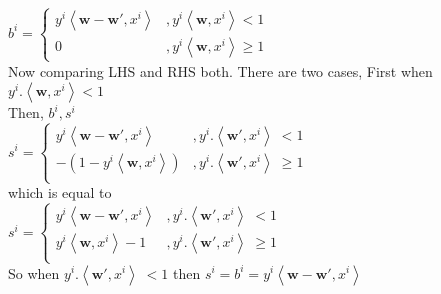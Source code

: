 \documentclass[a4paper,11pt]{article}
\begin{document}
\begin{mlsolution}
\begin{math}
b^{i} = \left\{\begin{matrix}
y^{i} \left \langle \textbf{w} - \textbf{w}{}', x^{i} \right \rangle & ,y^{i}\left \langle \textbf{w}, x^{i} \right \rangle < 1\\ 
0 & ,y^{i}\left \langle \textbf{w}, x^{i} \right \rangle \geq 1
\end{matrix}\right.
\end{math}\\

Now comparing LHS and RHS both. There are two cases, First when \begin{math}y^{i}.\left \langle \textbf{w}, x^{i} \right \rangle < 1 \end{math}\\

Then, \begin{math}b^{i}, s^{i}\end{math}\\

\begin{math}
s^{i} = \left\{\begin{matrix}
y^{i} \left \langle \textbf{w} -\textbf{w}{}', x^{i}\right \rangle & ,y^{i}.\left \langle \textbf{w}{}', x^{i} \right \rangle \; <  1\\ 
- \left ( 1 - y^{i}\left \langle \textbf{w}, x^{i}\right \rangle \right ) & ,y^{i}.\left \langle \textbf{w}{}', x^{i}\right \rangle \; \geq  1\\ 

\end{matrix}\right.
\end{math}\\

which is equal to \\

\begin{math}
s^{i} = \left\{\begin{matrix}
y^{i} \left \langle \textbf{w} -\textbf{w}{}', x^{i} \right \rangle & ,y^{i}.\left \langle \textbf{w}{}', x^{i}\right \rangle \; <  1\\ 
y^{i}\left \langle \textbf{w}, x^{i}\right \rangle -1 & ,y^{i}.\left \langle \textbf{w}{}', x^{i}\right \rangle \; \geq  1\\ 

\end{matrix}\right.
\end{math}\\

So when \begin{math}y^{i}.\left \langle \textbf{w}{}', x^{i} \right \rangle \; <  1\end{math} then \; \begin{math} s^{i} = b^{i} = y^{i} \left \langle \textbf{w} -\textbf{w}{}', x^{i} \right \rangle \end{math} \\


\end{mlsolution}
\end{document}
